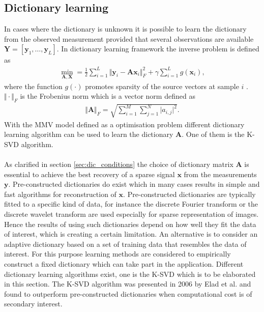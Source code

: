 \subsection{Dictionary learning}\label{sec:dictionarylearning}
In cases where the dictionary is unknown it is possible to learn the dictionary from the observed measurement provided that several observations are available $\textbf{Y}=\left[ \textbf{y}_1, \dots ,\textbf{y}_L \right]$. 
In dictionary learning framework the inverse problem is defined as
\begin{align*}
\min_{\mathbf{A,X}} = \frac{1}{2} \sum_{i=1}^{L} \Vert \mathbf{y} _i - \mathbf{Ax}_i \Vert_F^2 + \gamma \sum_{i=1}^{L} g(\mathbf{x}_i),
\end{align*}
where the function $g(\cdot)$ promotes sparsity of the source vectors at sample $i$ \cite[p. 4]{phd}. $\Vert \cdot \Vert_F$ is the Frobenius norm which is a vector norm defined as 
\begin{align*}
\Vert \mathbf{A} \Vert_F = \sqrt{\sum_{i=1}^M \sum_{j=1}^N \vert a_{i,j} \vert^2}.
\end{align*}
With the MMV model defined as a optimisation problem different dictionary learning algorithm can be used to learn the dictionary $\mathbf{A}$. One of them is the K-SVD algorithm.
\\ \\
As clarified in section \ref{sec:dic_conditions} the choice of dictionary matrix $\textbf{A}$ is essential to achieve the best recovery of a sparse signal $\textbf{x}$ from the measurements $\textbf{y}$. Pre-constructed dictionaries do exist which in many cases results in simple and fast algorithms for reconstruction of $\textbf{x}$\cite{Elad_book}. Pre-constructed dictionaries are typically fitted to a specific kind of data, for instance the discrete Fourier transform or the discrete wavelet transform are used especially for sparse representation of images\cite{Elad_book}. Hence the results of using such dictionaries depend on how well they fit the data of interest, which is creating a certain limitation. An alternative is to consider an adaptive dictionary based on a set of training data that resembles the data of interest. For this purpose learning methods are considered to empirically construct a fixed dictionary which can take part in the application. Different dictionary learning algorithms exist, one is the K-SVD which is to be elaborated in this section. The K-SVD algorithm was presented in 2006 by Elad et al. and found to outperform pre-constructed dictionaries when computational cost is of secondary interest\cite{Elad2006}. \\
